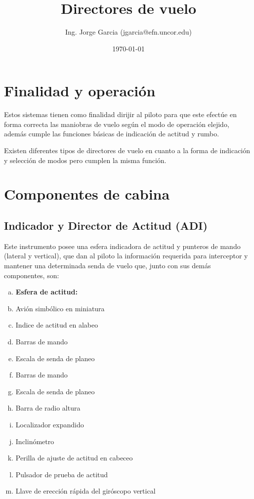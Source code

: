 \documentclass[a4paper,12pt,twoside]{article}
\title{Directores de vuelo}
\author{Ing. Jorge Garcia (jgarcia@efn.uncor.edu)}
\date{\today}
\begin{document}
\renewcommand{\tablename}{Tabla}

\newcommand{\ESPACIO}{\rule{0in}{3ex}}

\thispagestyle{fancy}
\maketitle

\thispagestyle{fancy}
\tableofcontents


\section{Finalidad y operaci\'on}
\label{sec:finalidad.y.operacion}


Estos sistemas tienen como finalidad dirijir al piloto para que este efect\'ue en forma correcta las maniobras de vuelo seg\'un el modo de operaci\'on elejido, adem\'as cumple las funciones b\'asicas de indicaci\'on de actitud y rumbo.

Existen diferentes tipos de directores de vuelo en cuanto a la forma de 
indicaci\'on y selecci\'on de modos pero cumplen la misma funci\'on.

\section{Componentes de cabina}
\label{sec:componentes.cabina}

\subsection{Indicador y Director de Actitud (ADI)}
\label{sec:adi}

Este instrumento posee una esfera indicadora de actitud y punteros de 
mando (lateral y vertical), que dan al piloto la informaci\'on requerida
para interceptor y mantener una determinada senda de vuelo que, junto
con sus dem\'as componentes, son:

\begin{enumerate}[(a)]
	\item \textbf{Esfera de actitud: }
        \item Avi\'on simb\'olico en miniatura
        \item Indice de actitud en alabeo
        \item Barras de mando
        \item Escala de senda de planeo
        \item Barras de mando
        \item Escala de senda de planeo
        \item Barra de radio altura
        \item Localizador expandido
        \item Inclin\'ometro
        \item Perilla de ajuste de actitud en cabeceo
        \item Pulsador de prueba de actitud
        \item Llave de erecci\'on r\'apida del gir\'oscopo vertical
          

\end{enumerate}
\end{document}
